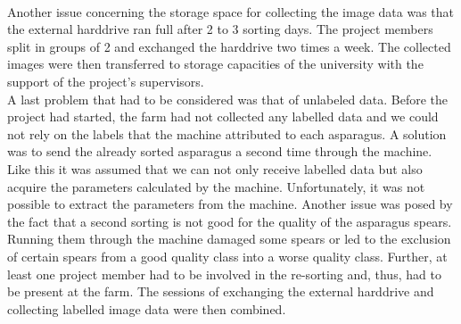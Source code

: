 \\
Another issue concerning the storage space for collecting the image data was that the external harddrive ran full after 2 to 3 sorting days. The project members split in groups of 2 and exchanged the harddrive two times a week. The collected images were then transferred to storage capacities of the university with the support of the project’s supervisors. \\
A last problem that had to be considered was that of unlabeled data. Before the project had started, the farm had not collected any labelled data and we could not rely on the labels that the machine attributed to each asparagus. A solution was to send the already sorted asparagus a second time through the machine. Like this it was assumed that we can not only receive labelled data but also acquire the parameters calculated by the machine. Unfortunately, it was not possible to extract the parameters from the machine. Another issue was posed by the fact that a second sorting is not good for the quality of the asparagus spears. Running them through the machine damaged some spears or led to the exclusion of certain spears from a good quality class into a worse quality class. Further, at least one project member had to be involved in the re-sorting and, thus, had to be present at the farm. The sessions of exchanging the external harddrive and collecting labelled image data were then combined. \\

